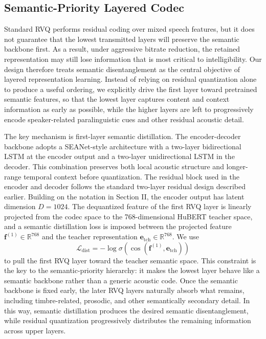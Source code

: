 \documentclass[conference]{IEEEtran}
\begin{document}
\subsection{Semantic-Priority Layered Codec}
Standard RVQ performs residual coding over mixed speech features, but it does not guarantee that the lowest transmitted layers will preserve the semantic backbone first. As a result, under aggressive bitrate reduction, the retained representation may still lose information that is most critical to intelligibility. Our design therefore treats semantic disentanglement as the central objective of layered representation learning. Instead of relying on residual quantization alone to produce a useful ordering, we explicitly drive the first layer toward pretrained semantic features, so that the lowest layer captures content and context information as early as possible, while the higher layers are left to progressively encode speaker-related paralinguistic cues and other residual acoustic detail.

The key mechanism is first-layer semantic distillation. The encoder-decoder backbone adopts a SEANet-style architecture with a two-layer bidirectional LSTM at the encoder output and a two-layer unidirectional LSTM in the decoder. This combination preserves both local acoustic structure and longer-range temporal context before quantization. The residual block used in the encoder and decoder follows the standard two-layer residual design described earlier. Building on the notation in Section II, the encoder output has latent dimension $D=1024$. The dequantized feature of the first RVQ layer is linearly projected from the codec space to the 768-dimensional HuBERT teacher space, and a semantic distillation loss is imposed between the projected feature $\mathbf{f}^{(1)}\in\mathbb{R}^{768}$ and the teacher representation $\mathbf{e}_{\mathrm{tch}}\in\mathbb{R}^{768}$. We use
\begin{equation}
\mathcal{L}_{\mathrm{dist}}=-\log\sigma\!\left(\cos(\mathbf{f}^{(1)},\mathbf{e}_{\mathrm{tch}})\right)
\end{equation}
to pull the first RVQ layer toward the teacher semantic space. This constraint is the key to the semantic-priority hierarchy: it makes the lowest layer behave like a semantic backbone rather than a generic acoustic code. Once the semantic backbone is fixed early, the later RVQ layers naturally absorb what remains, including timbre-related, prosodic, and other semantically secondary detail. In this way, semantic distillation produces the desired semantic disentanglement, while residual quantization progressively distributes the remaining information across upper layers.
\end{document}
